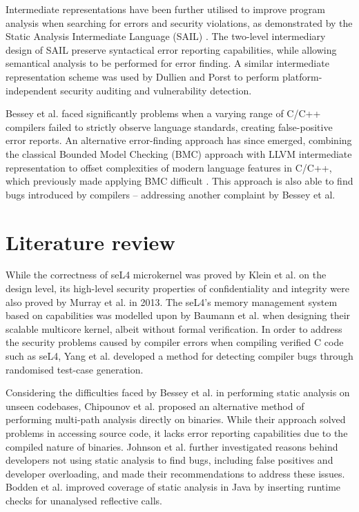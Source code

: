 \documentclass[11pt]{article}
\begin{document}
Intermediate representations have been further utilised to improve program analysis when searching for errors and security violations, as demonstrated by the Static Analysis Intermediate Language (SAIL) \cite{dillig2009sail}. The two-level intermediary design of SAIL preserve syntactical error reporting capabilities, while allowing semantical analysis to be performed for error finding. A similar intermediate representation scheme was used by Dullien and Porst \cite{dullien2009reil} to perform platform-independent security auditing and vulnerability detection.

Bessey et al. \cite{bessey2010few} faced significantly problems when a varying range of C/C++ compilers failed to strictly observe language standards, creating false-positive error reports. An alternative error-finding approach has since emerged, combining the classical Bounded Model Checking (BMC) approach with LLVM intermediate representation to offset complexities of modern language features in C/C++, which previously made applying BMC difficult \cite{merz2012llbmc}. This approach is also able to find bugs introduced by compilers -- addressing another complaint by Bessey et al.

\section{Literature review}

While the correctness of seL4 microkernel was proved by Klein et al. \cite{klein2009sel4} on the design level, its high-level security properties of confidentiality and integrity were also proved by Murray et al. \cite{murray2013sel4} in 2013. The seL4's memory management system based on capabilities was modelled upon by Baumann et al. \cite{baumann2009multikernel} when designing their scalable multicore kernel, albeit without formal verification. In order to address the security problems caused by compiler errors when compiling verified C code such as seL4, Yang et al. \cite{yang2011finding} developed a method for detecting compiler bugs through randomised test-case generation. 

Considering the difficulties faced by Bessey et al. \cite{bessey2010few} in performing static analysis on unseen codebases, Chipounov et al.  \cite{chipounov2011s2e} proposed an alternative method of performing multi-path analysis directly on binaries. While their approach solved problems in accessing source code, it lacks error reporting capabilities due to the compiled nature of binaries. Johnson et al. \cite{johnson2013don} further investigated reasons behind developers not using static analysis to find bugs, including false positives and developer overloading, and made their recommendations to address these issues. Bodden et al. \cite{bodden2011taming} improved coverage of static analysis in Java by inserting runtime checks for unanalysed reflective calls.
\end{document}
